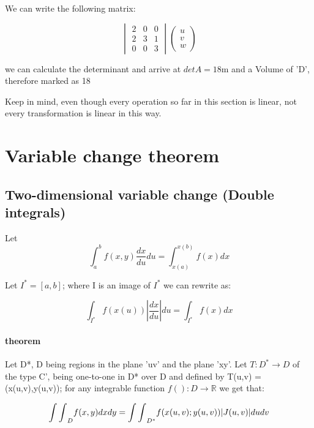 \documentclass[11pt,fleqn]{book} %
\begin{document}
We can write the following matrix:

\begin{equation}
    \begin{vmatrix}
        2 & 0 & 0 \\
        2 & 3 & 1 \\
        0 & 0 & 3
    \end{vmatrix} \begin{pmatrix}
        u \\
        v \\ 
        w 
    \end{pmatrix}
\end{equation}

we can calculate the determinant and arrive at $detA = 18$m and a Volume of 'D', therefore marked as 18 

Keep in mind, even though every operation so far in this section is linear, not every transformation is linear in this way. 

\section{Variable change theorem}

\subsection{Two-dimensional variable change (Double integrals)}

Let
\begin{equation}
    \int_a^b f(x,y) \frac{dx}{du} du = \int_{x(a)}^{x(b)} f(x) dx
\end{equation}

Let $I^* = [a,b]$; where I is an image of $I^*$
we can rewrite as:

\begin{equation}
    \int_{I^*} f(x(u)) |\frac{dx}{du}| du =\int_{I^*} f(x) dx  
\end{equation}

\paragraph{theorem}

Let D*, D being regions in the plane 'uv' and the plane 'xy'. Let $T:D^* \to D$
of the type C', being one-to-one in D* over D and defined by T(u,v) = (x(u,v),y(u,v));
for any integrable function $f():D\to \mathbb{R}$ we get that:

\begin{equation}
    {\int\int}_D f(x,y) dxdy = {\int\int}_{D^*} f (x(u,v) ; y(u,v)) |J(u,v)| dudv\\
\end{equation}
\end{document}
